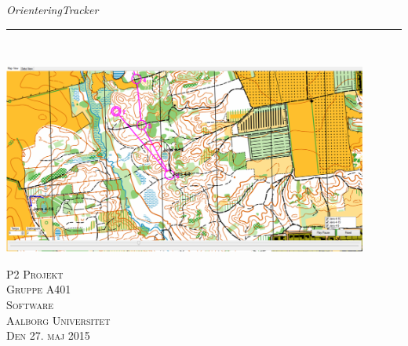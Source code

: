 \thispagestyle{empty}
\begin{flushright}
\vspace{3cm}

\phantom{hul}

\phantom{hul}

\phantom{hul}

\textsl{\Huge OrienteringTracker} \\ \vspace{1cm}

\rule{13cm}{3mm} \\ \vspace{1.5cm}
\vspace{1cm}

\includegraphics[width=0.90\textwidth]{billeder/OT}
\vspace{4cm}

\vspace{2cm} 
\textsc{\Large P2 Projekt \\
Gruppe A401 \\
Software\\
Aalborg Universitet\\
Den 27. maj 2015\\}
\end{flushright}
